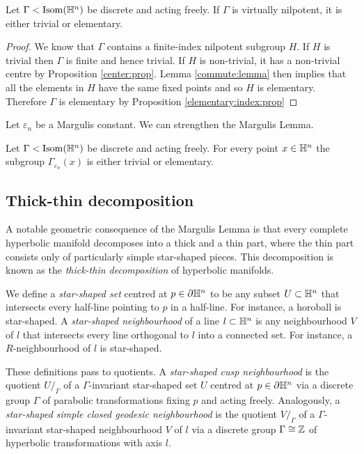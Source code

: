 \begin{cor}
Let $\Gamma<{\rm Isom}(\mathbb{H}^n)$ be discrete and acting freely. If $\Gamma$ is virtually nilpotent, it is either trivial or elementary.
\end{cor}
\begin{proof}
We know that $\Gamma$ contains a finite-index nilpotent subgroup $H$. If $H$ is trivial then $\Gamma$ is finite and hence trivial. If $H$ is non-trivial, it has a non-trivial centre by Proposition \ref{center:prop}. Lemma \ref{commute:lemma} then implies that all the elements in $H$ have the same fixed points and so $H$ is elementary. Therefore $\Gamma$ is elementary by Proposition \ref{elementary:index:prop}
\end{proof}

Let $\varepsilon_n$ be a Margulis constant. We can strengthen the Margulis Lemma.

\begin{cor}
Let $\Gamma<{\rm Isom}(\mathbb{H}^n)$ be discrete and acting freely. For every point $x\in \mathbb{H}^n$ the subgroup $\Gamma_{\varepsilon_n}(x)$ is either trivial or elementary.
\end{cor}

\subsection{Thick-thin decomposition}
A notable geometric consequence of the Margulis Lemma is that every complete hyperbolic manifold decomposes into a thick and a thin part, where the thin part consists only of particularly simple star-shaped pieces. This decomposition is known as the \emph{thick-thin decomposition} of hyperbolic manifolds.

We define a \emph{star-shaped set} centred at $p\in\partial\mathbb{H}^n$ to be any subset $U\subset\mathbb{H}^n$ that intersects every half-line pointing to $p$ in a half-line. For instance, a horoball is star-shaped. A \emph{star-shaped neighbourhood} of a line $l\subset\mathbb{H}^n$ is any neighbourhood $V$ of $l$ that intersects every line orthogonal to $l$ into a connected set. For instance, a $R$-neighbourhood of $l$ is star-shaped.

These definitions pass to quotients. A \emph{star-shaped cusp neighbourhood} is the quotient $U/_\Gamma$ of a $\Gamma$-invariant star-shaped set $U$ centred at $p\in\partial \mathbb{H}^n$ via a discrete group $\Gamma$ of parabolic transformations fixing $p$ and acting freely. Analogously, a \emph{star-shaped simple closed geodesic neighbourhood} is the quotient $V/_\Gamma$ of a $\Gamma$-invariant star-shaped neighbourhood $V$ of $l$ via a discrete group $\Gamma\cong \mathbb{Z}$ of hyperbolic transformations with axis $l$.

